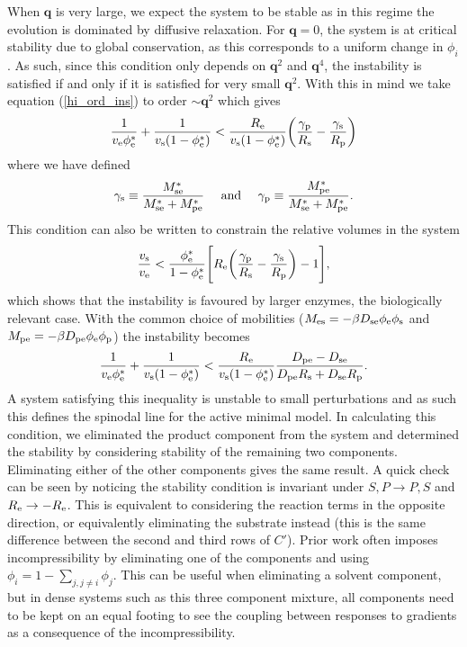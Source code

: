 When $\bm{q}$ is very large, we expect the system to be stable as in this regime the evolution is dominated by diffusive relaxation. For $\bm{q} = 0$, the system is at critical stability due to global conservation, as this corresponds to a uniform change in $\phi_i$. As such, since this condition only depends on $\bm{q}^2$ and $\bm{q}^4$, the instability is satisfied if and only if it is satisfied for very small $\bm{q}^2$. With this in mind we take equation (\ref{hi_ord_ins}) to order $\sim\bm{q}^2$ which gives
\begin{align}
    \frac{1}{v_{\mathrm{e}}\phi_{\mathrm{e}}^*}+\frac{1}{v_{\mathrm{s}}(1-\phi_{\mathrm{e}}^*)} < \frac{R_\mathrm{e} }{v_{\mathrm{s}}(1-\phi_{\mathrm{e}}^*)}\bigg(\frac{\gamma_\mathrm{p}}{R_\mathrm{s} }-\frac{\gamma_\mathrm{s}}{R_\mathrm{p} }\bigg)
    \label{eq_form_cond}
\end{align}
where we have defined
\begin{equation}
    \gamma_\mathrm{s} \equiv \frac{M_{\mathrm{se}}^*}{M_{\mathrm{se}}^*+M_{\mathrm{pe}}^*} \quad \text{   and    } \quad \gamma_\mathrm{p} \equiv \frac{M_{\mathrm{pe}}^*}{M_{\mathrm{se}}^*+M_{\mathrm{pe}}^*}.
\end{equation}
This condition can also be written to constrain the relative volumes in the system
\begin{equation}
    \frac{v_{\mathrm{s}}}{v_{\mathrm{e}}} < \frac{\phi_{\mathrm{e}}^*}{1-\phi_{\mathrm{e}}^*}\Bigg[R_\mathrm{e} \bigg(\frac{\gamma_\mathrm{p}}{R_\mathrm{s} }-\frac{\gamma_\mathrm{s}}{R_\mathrm{p} }\bigg) - 1\Bigg],
    \label{vol_ins}
\end{equation}
which shows that the instability is favoured by larger enzymes, the biologically relevant case. With the common choice of mobilities ($M_{\mathrm{es}} = -\beta D_{\mathrm{se}}\phi_{\mathrm{e}}\phi_{\mathrm{s}}$ and $M_{\mathrm{pe}} = -\beta D_{\mathrm{pe}}\phi_{\mathrm{e}}\phi_{\mathrm{p}}$) the instability becomes
\begin{equation}
    \frac{1}{v_{\mathrm{e}}\phi_{\mathrm{e}}^*}+\frac{1}{v_{\mathrm{s}}(1-\phi_{\mathrm{e}}^*)} < \frac{R_\mathrm{e} }{v_{\mathrm{s}}(1-\phi_{\mathrm{e}}^*)}\frac{D_{\mathrm{pe}}-D_{\mathrm{se}}}{D_{\mathrm{pe}}R_\mathrm{s} +D_{\mathrm{se}}R_\mathrm{p} }. \label{eq:inst}
\end{equation}
A system satisfying this inequality is unstable to small perturbations and as such this defines the spinodal line for the active minimal model. In calculating this condition, we eliminated the product component from the system and determined the stability by considering stability of the remaining two components. Eliminating either of the other components gives the same result. A quick check can be seen by noticing the stability condition is invariant under $S, P \rightarrow P, S$ and $R_\mathrm{e} \rightarrow -R_\mathrm{e}$. This is equivalent to considering the reaction terms in the opposite direction, or equivalently eliminating the substrate instead (this is the same difference between the second and third rows of $C'$). Prior work often imposes incompressibility by eliminating one of the components and using $\phi_i = 1-\sum_{j,j\neq i}\phi_j$. This can be useful when eliminating a solvent component, but in dense systems such as this three component mixture, all components need to be kept on an equal footing to see the coupling between responses to gradients as a consequence of the incompressibility.

